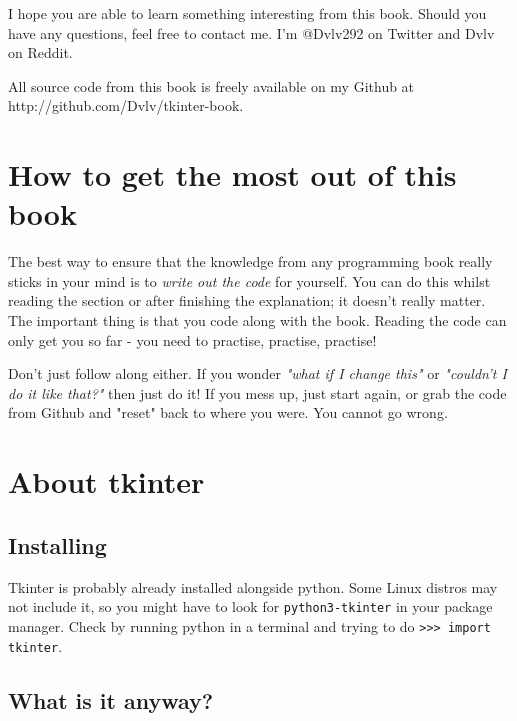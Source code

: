 \documentclass[a4paper,11pt,openany]{book}
\newcommand{\myGithub}{http://github.com/Dvlv/tkinter-book}
\begin{document}
\vspace{5mm}

I hope you are able to learn something interesting from this book. Should you have any questions, feel free to contact me. I'm @Dvlv292 on Twitter and Dvlv on Reddit. 

\vspace{5mm}

All source code from this book is freely available on my Github at \myGithub{}.  

\section{How to get the most out of this book}

The best way to ensure that the knowledge from any programming book really sticks in your mind is to \textit{write out the code} for yourself. You can do this whilst reading the section or after finishing the explanation; it doesn't really matter. The important thing is that you code along with the book. Reading the code can only get you so far - you need to practise, practise, practise! 

\vspace{5mm}

Don't just follow along either. If you wonder \textit{"what if I change this"} or \textit{"couldn't I do it like that?"} then just do it! If you mess up, just start again, or grab the code from Github and "reset" back to where you were. You cannot go wrong. 

\section{About tkinter}

\subsection{Installing}

Tkinter is probably already installed alongside python. Some Linux distros may not include it, so you might have to look for \lstinline[columns=fixed]{python3-tkinter} in your package manager. Check by running python in a terminal and trying to do \lstinline[columns=fixed]{>>> import tkinter}. 

\subsection{What is it anyway?}
\end{document}
